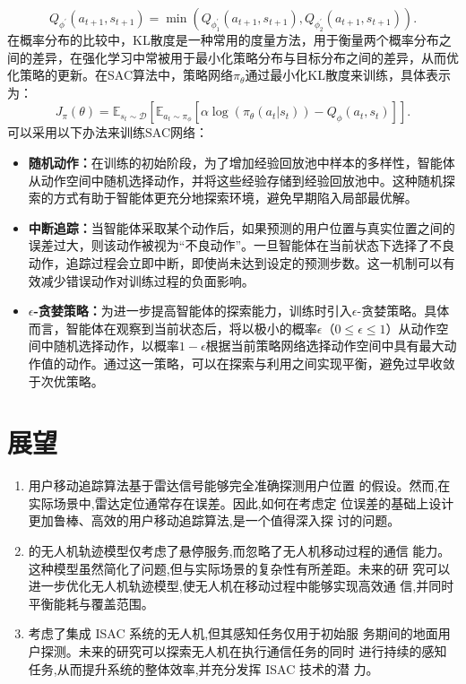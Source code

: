 \documentclass{article}
\begin{document}
\begin{equation}\label{eq3-18}
	Q_{\phi^{'}} \left(a_{t+1},s_{t+1}\right)=\min\left(Q_{\phi_1^{'}} \left(a_{t+1},s_{t+1}\right),Q_{\phi_2^{'}} \left(a_{t+1},s_{t+1}\right)\right).
\end{equation}
在概率分布的比较中，KL散度是一种常用的度量方法，用于衡量两个概率分布之间的差异，在强化学习中常被用于最小化策略分布与目标分布之间的差异，从而优化策略的更新。在SAC算法中，策略网络$\pi_\theta$通过最小化KL散度来训练，具体表示为：
\begin{equation}\label{eq3-19}
	J_{\pi}\left(\theta\right)=\mathbb{E}_{s_t\sim\mathcal{D}}\left[\mathbb{E}_{a_t\sim\pi_{\phi}}\left[\alpha\log\left(\pi_{\theta}\left(a_t|s_t\right)\right)-Q_{\phi}\left(a_t,s_t\right)\right]\right].
\end{equation}
可以采用以下办法来训练SAC网络：
\begin{itemize} 
	\item \textbf{随机动作：}在训练的初始阶段，为了增加经验回放池中样本的多样性，智能体从动作空间中随机选择动作，并将这些经验存储到经验回放池中。这种随机探索的方式有助于智能体更充分地探索环境，避免早期陷入局部最优解。 
	\item \textbf{中断追踪：}当智能体采取某个动作后，如果预测的用户位置与真实位置之间的误差过大，则该动作被视为“不良动作”。一旦智能体在当前状态下选择了不良动作，追踪过程会立即中断，即使尚未达到设定的预测步数。这一机制可以有效减少错误动作对训练过程的负面影响。
	\item \textbf{$\epsilon$-贪婪策略：}为进一步提高智能体的探索能力，训练时引入$\epsilon$-贪婪策略。具体而言，智能体在观察到当前状态后，将以极小的概率$\epsilon$（$0 \le \epsilon \le 1$）从动作空间中随机选择动作，以概率$1-\epsilon$根据当前策略网络选择动作空间中具有最大动作值的动作。通过这一策略，可以在探索与利用之间实现平衡，避免过早收敛于次优策略。
\end{itemize}

\section{展望}
\begin{enumerate}
  \item 用户移动追踪算法基于雷达信号能够完全准确探测用户位置  的假设。然而,在实际场景中,雷达定位通常存在误差。因此,如何在考虑定  位误差的基础上设计更加鲁棒、高效的用户移动追踪算法,是一个值得深入探  讨的问题。  
  \item 的无人机轨迹模型仅考虑了悬停服务,而忽略了无人机移动过程的通信  能力。这种模型虽然简化了问题,但与实际场景的复杂性有所差距。未来的研  究可以进一步优化无人机轨迹模型,使无人机在移动过程中能够实现高效通  信,并同时平衡能耗与覆盖范围。  
  \item 考虑了集成 ISAC 系统的无人机,但其感知任务仅用于初始服  务期间的地面用户探测。未来的研究可以探索无人机在执行通信任务的同时  进行持续的感知任务,从而提升系统的整体效率,并充分发挥 ISAC 技术的潜  力。
\end{enumerate}
    

    \label{EndBody}        


\newpage
\pagestyle{empty}



\end{document}
